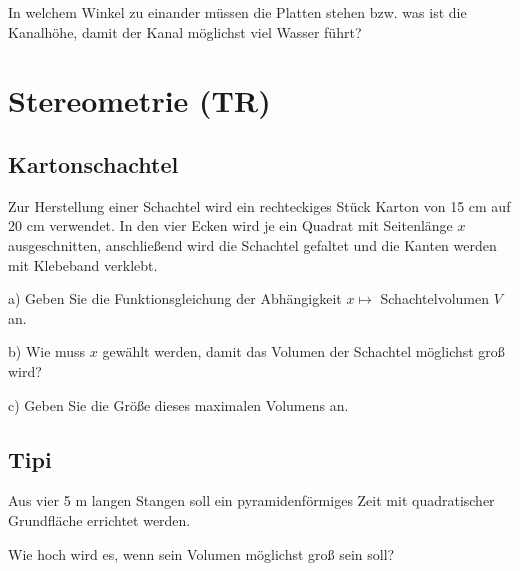 In welchem Winkel zu einander müssen die Platten stehen bzw. was ist
die Kanalhöhe, damit der Kanal möglichst viel Wasser führt?



\newpage\section{Stereometrie (TR)}

\subsection{Kartonschachtel}
Zur Herstellung einer Schachtel wird ein rechteckiges
Stück Karton von 15 cm auf 20 cm verwendet. In
den vier Ecken wird je ein Quadrat mit Seitenlänge $x$
ausgeschnitten, anschließend wird die Schachtel
gefaltet und die Kanten werden mit Klebeband
verklebt.

a)
Geben Sie die Funktionsgleichung der Abhängigkeit $x \mapsto$ Schachtelvolumen $V$ an.

b)
Wie muss $x$ gewählt werden, damit das Volumen
der Schachtel möglichst groß wird?

c)
Geben Sie die Größe dieses maximalen Volumens
an.





\subsection{Tipi}

Aus vier 5 m langen Stangen soll ein
pyramidenförmiges Zeit mit quadratischer Grundfläche errichtet werden.

Wie hoch wird es, wenn sein Volumen möglichst groß sein soll?

